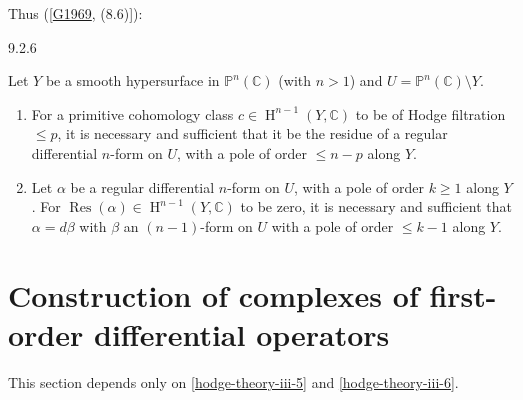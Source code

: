     Thus ([\hyperref[G1969]{G1969}, (8.6)]):\begin{proposition}{9.2.6}\label{hodge-theory-iii-9.2.6}\skipsinglepar\par{}Let \(Y\) be a smooth hypersurface in \(\mathbb {P}^n(\mathbb {C})\) (with \(n>1\)) and \(U=\mathbb {P}^n(\mathbb {C})\setminus  Y\).

    
 \begin{enumerate}
      
 \item[(i)]
        For a primitive cohomology class \(c\in \operatorname {H}^{n-1}(Y,\mathbb {C})\) to be of Hodge filtration \(\leq  p\), it is necessary and sufficient that it be the residue of a regular differential \(n\)-form on \(U\), with a pole of order \(\leqslant  n-p\) along \(Y\).
      


      
 \item[(ii)]
        Let \(\alpha \) be a regular differential \(n\)-form on \(U\), with a pole of order \(k\geqslant 1\) along \(Y\).
        For \(\operatorname {Res}(\alpha )\in \operatorname {H}^{n-1}(Y,\mathbb {C})\) to be zero, it is necessary and sufficient that \(\alpha =d\beta \) with \(\beta \) an \((n-1)\)-form on \(U\) with a pole of order \(\leqslant  k-1\) along \(Y\).
      

    \end{enumerate}\end{proposition}\section{Construction of complexes of first-order differential operators}\label{hodge-theory-iii-9.3}\par{}This section depends only on \cref{hodge-theory-iii-5} and \cref{hodge-theory-iii-6}.
